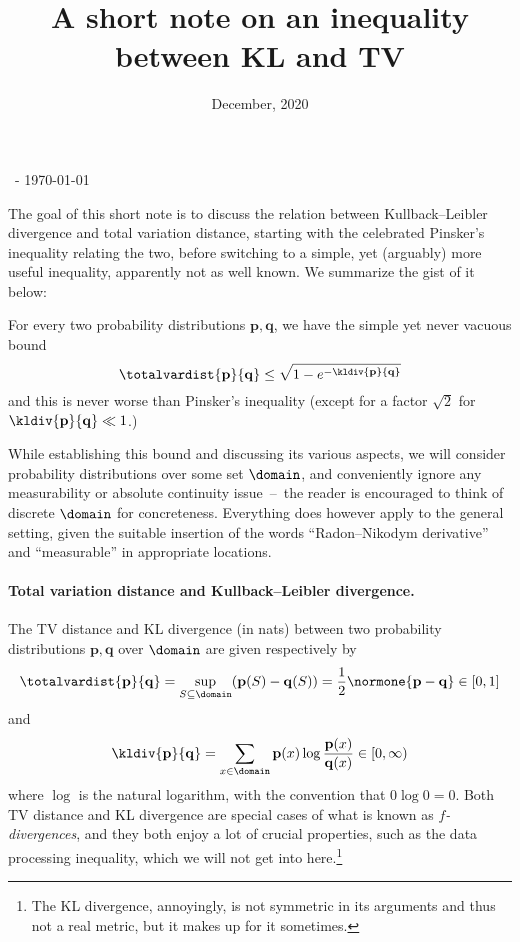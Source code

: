 \documentclass[10pt]{article}
\title{A short note on an inequality between KL and TV}
\date{December, 2020}
\newcommand{\p}{\mathbf{p}}
\newcommand{\q}{\mathbf{q}}
\begin{document}
\begin{flushleft}\sf\footnotesize
\makeatletter
\@date~- \today \hfill \@title
\makeatother
\end{flushleft}
\vspace{5mm}

The goal of this short note is to discuss the relation between Kullback--Leibler divergence and total variation distance, starting with the celebrated Pinsker's inequality relating the two, before switching to a simple, yet (arguably) more useful inequality, apparently not as well known. We summarize the gist of it below:

\begin{theorem}
  \label{theo:bh}
    For every two probability distributions $\p,\q$, we have the simple yet never vacuous bound
    \begin{equation}
        \totalvardist{\p}{\q} \leq \sqrt{1-e^{-\kldiv{\p}{\q}}}
    \end{equation}
    and this is never worse than Pinsker's inequality (except for a factor $\sqrt{2}$ for $\kldiv{\p}{\q}\ll 1$.)
\end{theorem}
While establishing this bound and discussing its various aspects, we will consider probability distributions over some set $\domain$, and conveniently ignore any measurability or absolute continuity issue~--~the reader is encouraged to think of discrete $\domain$ for concreteness. Everything does however apply to the general setting, given the suitable insertion of the words ``Radon--Nikodym derivative'' and ``measurable'' in appropriate locations.

\paragraph{Total variation distance and Kullback--Leibler divergence.}

The TV distance and KL divergence (in nats) between two probability distributions $\p,\q$ over $\domain$ are given respectively by
\[
    \totalvardist{\p}{\q} = \sup_{S\subseteq \domain} (\p(S)-\q(S)) = \frac{1}{2}\normone{\p-\q}\in[0,1]
\]
and
\[
    \kldiv{\p}{\q}  = \sum_{x\in\domain} \p(x)\log\frac{\p(x)}{\q(x)} \in [0,\infty)
\]
where $\log$ is the natural logarithm, with the convention that $0\log 0 = 0$. Both TV distance and KL divergence are special cases of what is known as \emph{$f$-divergences}, and they both enjoy a lot of crucial properties, such as the data processing inequality, which we will not get into here.\footnote{The KL divergence, annoyingly, is not symmetric in its arguments and thus not a real metric, but it makes up for it sometimes.}
\end{document}
